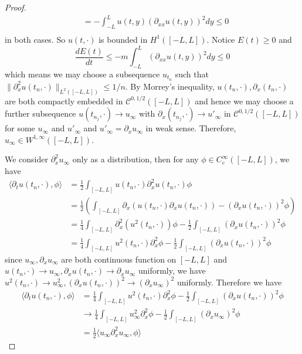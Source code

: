 \begin{proof}
\[\begin{aligned}
    &= - \int^{L}_{-L}u(t,y)(\partial_{xx}u(t,y))^2dy \leq 0\\
\end{aligned}
\]
in both cases. So $u(t,\cdot)$ is bounded in $H^1([-L,L])$. Notice $E(t) \geq 0$ and 
\[
\dfrac{dE(t)}{dt} \leq -m\int^L_{-L} (\partial_{xx}u(t,y))^2 dy \leq 0 
\]
which means we may choose a subsequence $u_{t_n}$ such that $\lVert\partial_x^2 u(t_n,\cdot)\rVert_{L^{2}([-L,L])} \leq 1/n$. By Morrey's inequality, $u(t_n,\cdot),\partial_x(t_n,\cdot)$ are both compactly embedded in $\mathcal{C}^{0,1/2}([-L,L])$ and hence we may choose a further subsequence $u(t_{n_j},\cdot) \to u_{\infty}$ with $\partial_x(t_{n_j},\cdot) \to u'_{\infty}$ in $\mathcal{C}^{0,1/2}([-L,L])$ for some $u_{\infty}$ and $u'_{\infty}$ and $u'_{\infty} = \partial_x u_{\infty}$ in weak sense. Therefore, $u_{\infty} \in W^{1,\infty}([-L,L])$.\par
We consider $\partial_x^2 u_{\infty}$ only as a distribution, then for any $\phi \in C^{\infty}_c([-L,L])$, we have
\[
    \begin{aligned}
        \langle \partial_t u (t_n,\cdot), \phi \rangle &= \tfrac12 \int_{[-L,L]}   u (t_n,\cdot)\partial_{x}^2u (t_n,\cdot)\phi \\
        &= \tfrac12 \left(\int_{[-L,L]} \partial_x(u (t_n,\cdot)\partial_x u (t_n,\cdot)) - (\partial_x u (t_n,\cdot))^2 \phi\right) \\
        &= \tfrac14 \int_{[-L,L]} \partial_x^2 (u^2 (t_n,\cdot))\phi - \tfrac12 \int_{[-L,L]}(\partial_x u (t_n,\cdot))^2\phi \\
        &= \tfrac14 \int_{[-L,L]} u^2(t_n,\cdot)\partial_x^2 \phi - \tfrac12 \int_{[-L,L]}(\partial_x u (t_n,\cdot))^2\phi
    \end{aligned}
\]
since $u_{\infty},\partial_xu_{\infty}$ are both continuous function on $[-L,L]$ and $u(t_n,\cdot) \to u_{\infty}, \partial_x u(t_n,\cdot) \to \partial_x u_{\infty}$ uniformly, we have $u^2(t_n,\cdot) \to u^2_{\infty}, (\partial_x u(t_n,\cdot))^2 \to (\partial_x u_{\infty})^2$ uniformly. Therefore we have
\[
\begin{aligned}
     \langle \partial_t u (t_n,\cdot), \phi \rangle &=  \tfrac14 \int_{[-L,L]} u^2(t_n,\cdot)\partial_x^2 \phi - \tfrac12 \int_{[-L,L]}(\partial_x u (t_n,\cdot))^2\phi \\
     &\to \tfrac14 \int_{[-L,L]} u^2_{\infty}\partial_x^2 \phi - \tfrac12 \int_{[-L,L]}(\partial_x u_{\infty})^2\phi \\
     &= \tfrac12 \langle u_{\infty}\partial_x^2 u_{\infty}, \phi\rangle

\end{aligned}\]
\end{proof}
